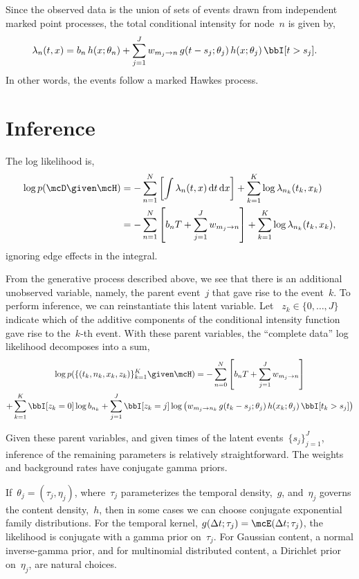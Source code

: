 Since the observed
data is the union of sets of events drawn from independent marked point processes,
the total conditional intensity for node~$n$ is given by,
\begin{align}
  \lambda_n(t, x) &= b_n \, h(x; \theta_n) + \sum_{j=1}^J w_{m_j \to n} \, g(t-s_j; \theta_j) \, h(x; \theta_j) \, \bbI[t > s_j].
\end{align}
In other words, the events follow a marked Hawkes process.


\section{Inference}
The log likelihood is,
\begin{align}
  \log p(\mcD \given \mcH) &= -\sum_{n=1}^N \left[\int \lambda_n(t,x) \, \mathrm{d}t \, \mathrm{d}x \right] + \sum_{k=1}^K \log \lambda_{n_k}(t_k, x_k) \\
  &= -\sum_{n=1}^N \left[b_n T + \sum_{j=1}^J w_{m_j \to n} \right] + \sum_{k=1}^K \log \lambda_{n_k} (t_k, x_k),
  \label{eq:loglkhd}
\end{align}
ignoring edge effects in the integral. 

From the generative process described above, we see that there is an
additional unobserved variable, namely, the parent event~$j$ that gave
rise to the event~$k$.  To perform inference, we can reinstantiate
this latent variable. Let ~$z_k \in \{0, \ldots, J\}$ indicate which
of the additive components of the conditional intensity function gave
rise to the~$k$-th event. With these parent variables, the
``complete data'' log likelihood decomposes into a sum,
\begin{multline}
  \log p(\{(t_k, n_k, x_k, z_k)\}_{k=1}^K \given \mcH) =
  -\sum_{n=0}^N \left[ b_n T + \sum_{j=1}^J w_{m_j \to n} \right] \\
  + \sum_{k=1}^K \bbI[z_k=0] \log b_{n_k} 
  + \sum_{j=1}^J \bbI[z_k=j] \log \left(w_{m_j \to n_k} \, g(t_k-s_j; \theta_j) \, h(x_k; \theta_j) \, \bbI[t_k > s_j] \right)
\end{multline}

Given these parent variables, and given times of the latent
events~$\{s_j\}_{j=1}^J$, inference of the remaining parameters is
relatively straightforward. The weights and background rates have
conjugate gamma priors.

If~$\theta_j = (\tau_j, \eta_j)$, where~$\tau_j$
parameterizes the temporal density,~$g$, and~$\eta_j$ governs
the content density,~$h$, then in some cases we can choose conjugate
exponential family distributions. For the temporal kernel,
$g(\Delta t; \tau_j) = \mcE(\Delta t; \tau_j)$,
the likelihood is conjugate with a gamma prior on~$\tau_j$.
For Gaussian content, a normal inverse-gamma prior, and for
multinomial distributed content, a Dirichlet prior on~$\eta_j$,
are natural choices.

